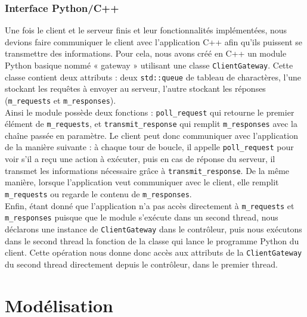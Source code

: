 \documentclass{report}
\begin{document}
\subsubsection{Interface Python/C++}
Une fois le client et le serveur finis et leur fonctionnalités implémentées, nous devions faire communiquer le client avec l'application C++ afin qu'ils puissent se transmettre des informations. Pour cela, nous avons créé en C++ un module Python basique nommé « gateway » utilisant une classe \verb!ClientGateway!. Cette classe contient deux attributs : deux \verb!std::queue! de tableau de charactères, l'une stockant les requêtes à envoyer au serveur, l'autre stockant les réponses (\verb!m_requests! et \verb!m_responses!).\\
Ainsi le module possède deux fonctions : \verb!poll_request! qui retourne le premier élément de \verb!m_requests!, et \verb!transmit_response! qui remplit \verb!m_responses! avec la chaîne passée en paramètre. Le client peut donc communiquer avec l'application de la manière suivante : à chaque tour de boucle, il appelle \verb!poll_request! pour voir s'il a reçu une action à exécuter, puis en cas de réponse du serveur, il transmet les informations nécessaire grâce à \verb!transmit_response!. De la même manière, lorsque l'application veut communiquer avec le client, elle remplit \verb!m_requests! ou regarde le contenu de \verb!m_responses!.\\
Enfin, étant donné que l'application n'a pas accès directement à \verb!m_requests! et \verb!m_responses! puisque que le module s'exécute dans un second thread, nous déclarons une instance de \verb!ClientGateway! dans le contrôleur, puis nous exécutons dans le second thread la fonction de la classe qui lance le programme Python du client. Cette opération nous donne donc accès aux attributs de la \verb!ClientGateway! du second thread directement depuis le contrôleur, dans le premier thread.

\section{Modélisation}
\end{document}
